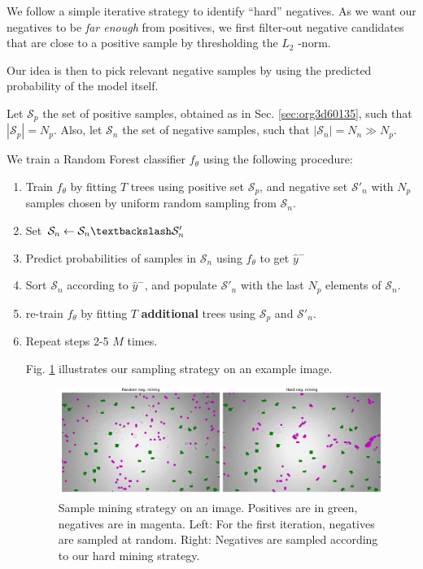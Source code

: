 \documentclass[11pt]{article}
\begin{document}
We follow a simple iterative strategy to identify ``hard'' negatives.
As we want our negatives to be \emph{far enough} from positives, we first filter-out negative candidates that are
close to a positive sample by thresholding the \(L_2\) -norm.

Our idea is then to pick relevant negative samples by using the predicted probability of the model itself.

Let \(\mathcal{S}_p\) the set of positive samples, obtained as in Sec. \ref{sec:org3d60135}, such that \(|\mathcal{S}_p|=N_p\).
Also, let \(\mathcal{S}_n\) the set of negative samples, such that \(|\mathcal{S}_n|=N_n \gg N_p\).


We train a Random Forest classifier \(f_\theta\) using the following procedure:

\begin{enumerate}
\item Train \(f_\theta\) by fitting \(T\) trees using positive set \(\mathcal{S}_p\), and negative set \(\mathcal{S}'_n\) with \(N_p\)
samples chosen by uniform random sampling from \(\mathcal{S}_n\).
\item Set \(\mathcal{S}_n \leftarrow \mathcal{S}_n \textbackslash \mathcal{S}'_n\)
\item Predict probabilities of samples in \(\mathcal{S}_n\) using \(f_\theta\) to get \(\hat{y}^-\)
\item Sort \(\mathcal{S}_n\) according to \(\hat{y}^-\), and populate
\(\mathcal{S}'_n\) with the last \(N_p\) elements of \(\mathcal{S}_n\).
\item re-train \(f_\theta\) by fitting \(T\) \textbf{additional} trees using \(\mathcal{S}_p\) and \(\mathcal{S}'_n\).
\item Repeat steps 2-5 \(M\) times.

Fig. \ref{fig:org987e887} illustrates our sampling strategy on an example image.

\begin{figure}[htbp]
\centering
\includegraphics[width=.9\linewidth]{./mining_prev.png}
\caption{\label{fig:org987e887}Sample mining strategy on an image. Positives are in green, negatives are in magenta. Left: For the first iteration, negatives are sampled at random. Right: Negatives are sampled according to our hard mining strategy.}
\end{figure}
\end{enumerate}
\end{document}
